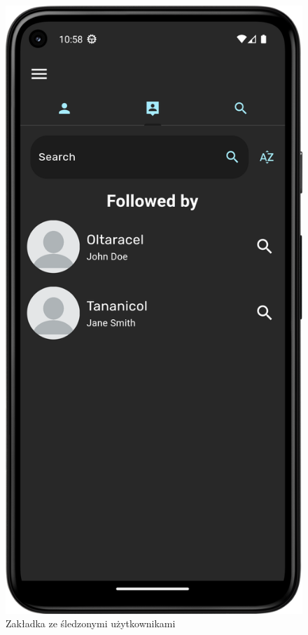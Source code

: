 \documentclass[a4paper,twoside,12pt]{book}
\begin{document}
\begin{figure}[H]
\begin{minipage}[b]{0.30\textwidth}
    \caption{Zakładka ze śledzonymi użytkownikami\\}
  \end{minipage}
  \hfill
  \begin{minipage}[b]{0.30\textwidth}
    \includegraphics[width=\textwidth]{mobile_ss/followingby.png}

\end{minipage}
\end{figure}
\end{document}
